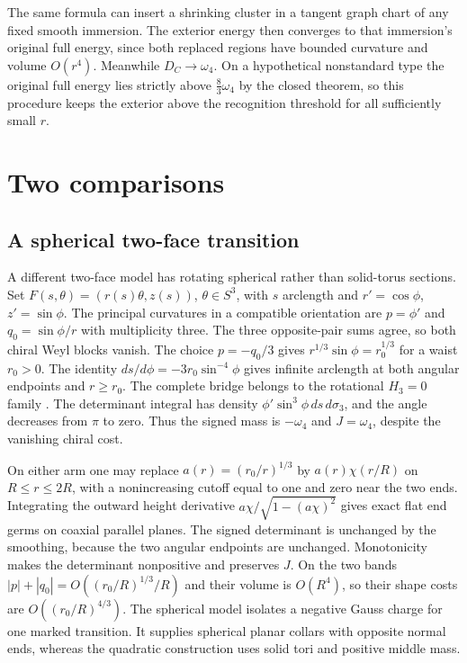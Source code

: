 \documentclass[11pt,letterpaper]{article}
\numberwithin{equation}{section}
\theoremstyle{definition}
\begin{document}
The same formula can insert a shrinking cluster in a tangent
graph chart of any fixed smooth immersion. The exterior energy
then converges to that immersion's original full energy, since
both replaced regions have bounded curvature and volume \(O(r^4)\).
Meanwhile \(D_C\to\omega_4\). On a hypothetical nonstandard
type the original full energy lies strictly above
\(\frac83\omega_4\) by the closed theorem, so this procedure
keeps the exterior above the recognition threshold for all
sufficiently small \(r\).

\section{Two comparisons}

\subsection{A spherical two-face transition}

A different two-face model has rotating spherical rather than
solid-torus sections. Set \(F(s,\theta)=(r(s)\theta,z(s))\),
\(\theta\in S^3\), with \(s\) arclength and \(r'=\cos\phi\),
\(z'=\sin\phi\). The principal curvatures in a compatible
orientation are \(p=\phi'\) and \(q_0=\sin\phi/r\) with
multiplicity three. The three opposite-pair sums agree, so
both chiral Weyl blocks vanish. The choice \(p=-q_0/3\)
gives \(r^{1/3}\sin\phi=r_0^{1/3}\) for a waist \(r_0>0\).
The identity \(ds/d\phi=-3r_0\sin^{-4}\phi\) gives infinite
arclength at both angular endpoints and \(r\ge r_0\).
The complete bridge belongs to the rotational
\(H_3=0\) family
\cite[\S1.2.1, equation (7) and Theorem~2(ii)]{Palmas1999RotationHypersurfaces}.
The determinant integral has density
\(\phi'\sin^3\phi\,ds\,d\sigma_3\), and the angle decreases
from \(\pi\) to zero. Thus the signed mass is \(-\omega_4\)
and \(J=\omega_4\), despite the vanishing chiral cost.

On either arm one may replace \(a(r)=(r_0/r)^{1/3}\)
by \(a(r)\chi(r/R)\) on \(R\le r\le2R\), with a nonincreasing
cutoff equal to one and zero near the two ends.
Integrating the outward height derivative
\(a\chi/\sqrt{1-(a\chi)^2}\) gives exact flat end germs
on coaxial parallel planes. The signed determinant is unchanged
by the smoothing, because the two angular endpoints are unchanged.
Monotonicity makes the determinant nonpositive and preserves \(J\).
On the two bands \(|p|+|q_0|=O((r_0/R)^{1/3}/R)\) and their
volume is \(O(R^4)\), so their shape costs are
\(O((r_0/R)^{4/3})\). The spherical model isolates a
negative Gauss charge for one marked transition. It supplies
spherical planar collars with opposite normal ends, whereas the
quadratic construction uses solid tori and positive middle mass.
\end{document}
